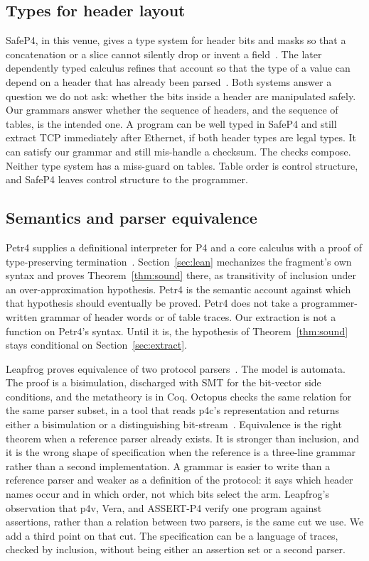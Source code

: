 \documentclass[a4paper,UKenglish,cleveref,autoref]{lipics-v2021}
\begin{document}
\subsection{Types for header layout}

SafeP4, in this venue, gives a type system for header bits and masks so that a concatenation or a slice cannot silently drop or invent a field~\cite{safep4}.
The later dependently typed calculus refines that account so that the type of a value can depend on a header that has already been parsed~\cite{depp4}.
Both systems answer a question we do not ask: whether the bits inside a header are manipulated safely.
Our grammars answer whether the sequence of headers, and the sequence of tables, is the intended one.
A program can be well typed in SafeP4 and still extract TCP immediately after Ethernet, if both header types are legal types.
It can satisfy our grammar and still mis-handle a checksum.
The checks compose.
Neither type system has a miss-guard on tables.
Table order is control structure, and SafeP4 leaves control structure to the programmer.

\subsection{Semantics and parser equivalence}

Petr4 supplies a definitional interpreter for P4 and a core calculus with a proof of type-preserving termination~\cite{petr4}.
Section~\ref{sec:lean} mechanizes the fragment's own syntax and proves Theorem~\ref{thm:sound} there, as transitivity of inclusion under an over-approximation hypothesis.
Petr4 is the semantic account against which that hypothesis should eventually be proved.
Petr4 does not take a programmer-written grammar of header words or of table traces.
Our extraction is not a function on Petr4's syntax.
Until it is, the hypothesis of Theorem~\ref{thm:sound} stays conditional on Section~\ref{sec:extract}.

Leapfrog proves equivalence of two protocol parsers~\cite{leapfrog}.
The model is automata.
The proof is a bisimulation, discharged with SMT for the bit-vector side conditions, and the metatheory is in Coq.
Octopus checks the same relation for the same parser subset, in a tool that reads p4c's representation and returns either a bisimulation or a distinguishing bit-stream~\cite{octopus}.
Equivalence is the right theorem when a reference parser already exists.
It is stronger than inclusion, and it is the wrong shape of specification when the reference is a three-line grammar rather than a second implementation.
A grammar is easier to write than a reference parser and weaker as a definition of the protocol: it says which header names occur and in which order, not which bits select the arm.
Leapfrog's observation that p4v, Vera, and ASSERT-P4 verify one program against assertions, rather than a relation between two parsers, is the same cut we use.
We add a third point on that cut.
The specification can be a language of traces, checked by inclusion, without being either an assertion set or a second parser.
\end{document}
